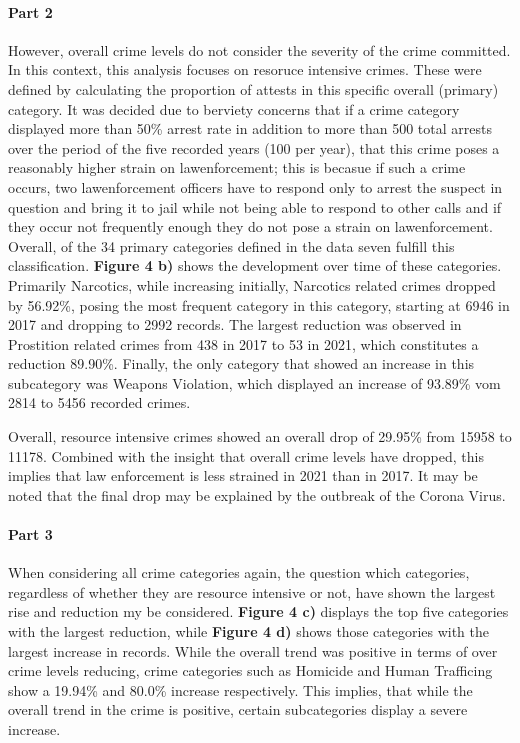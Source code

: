 \documentclass[a4paper]{article}
\begin{document}
\paragraph{Part 2} However, overall crime levels do not consider the severity of the crime committed. In this context, this analysis focuses on resoruce intensive crimes. These were defined by calculating the proportion of attests in this specific overall (primary) category. It was decided due to berviety concerns that if a crime category displayed more than 50\% arrest rate in addition to more than 500 total arrests over the period of the five recorded years (100 per year), that this crime poses a reasonably higher strain on lawenforcement; this is becasue if such a crime occurs, two lawenforcement officers have to respond only to arrest the suspect in question and bring it to jail while not being able to respond to other calls and if they occur not frequently enough they do not pose a strain on lawenforcement. Overall, of the 34 primary categories defined in the data seven fulfill this classification. \textbf{Figure 4 b)} shows the development over time of these categories. Primarily Narcotics, while increasing initially, Narcotics related crimes dropped by 56.92\%, posing the most frequent category in this category, starting at 6946 in 2017 and dropping to 2992 records. The largest reduction was observed in Prostition related crimes from 438 in 2017 to 53 in 2021, which constitutes a reduction 89.90\%. Finally, the only category that showed an increase in this subcategory was Weapons Violation, which displayed an increase of 93.89\% vom 2814 to 5456 recorded crimes.

Overall, resource intensive crimes showed an overall drop of 29.95\% from 15958 to 11178. Combined with the insight that overall crime levels have dropped, this implies that law enforcement is less strained in 2021 than in 2017. It may be noted that the final drop may be explained by the outbreak of the Corona Virus.

\paragraph{Part 3} When considering all crime categories again, the question which categories, regardless of whether they are resource intensive or not, have shown the largest rise and reduction my be considered. \textbf{Figure 4 c)} displays the top five categories with the largest reduction, while \textbf{Figure 4 d)} shows those categories with the largest increase in records. While the overall trend was positive in terms of over crime levels reducing, crime categories such as Homicide and Human Trafficing show a 19.94\% and 80.0\% increase respectively. This implies, that while the overall trend in the crime is positive, certain subcategories display a severe increase.  
\end{document}
